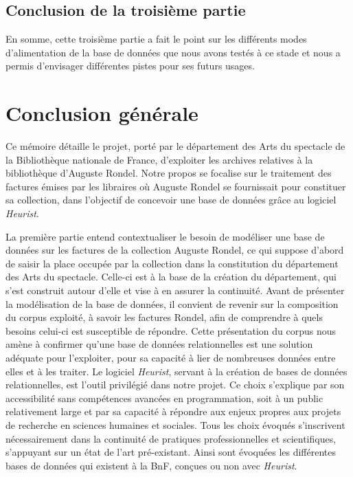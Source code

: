 \documentclass[12pt,twoside]{book}
\begin{document}
\section{Conclusion de la troisième partie}

En somme, cette troisième partie a fait le point sur les différents modes d'alimentation de la base de données que nous avons testés à ce stade et nous a permis d'envisager différentes pistes pour ses futurs usages. 


	\chapter*{Conclusion générale}

Ce mémoire détaille le projet, porté par le département des Arts du spectacle de la Bibliothèque nationale de France, d'exploiter les archives relatives à la bibliothèque d'Auguste Rondel. Notre propos se focalise sur le traitement des factures émises par les libraires où Auguste Rondel se fournissait pour constituer sa collection, dans l'objectif de concevoir une base de données grâce au logiciel \emph{Heurist}. 


La première partie entend contextualiser le besoin de modéliser une base de données sur les factures de la collection Auguste Rondel, ce qui suppose d'abord de saisir la place occupée par la collection dans la constitution du département des Arts du spectacle. Celle-ci est à la base de la création du département, qui s'est construit autour d'elle et vise à en assurer la continuité. Avant de présenter la modélisation de la base de données, il convient de revenir sur la composition du corpus exploité, à savoir les factures Rondel, afin de comprendre à quels besoins celui-ci est susceptible de répondre. Cette présentation du corpus nous amène à confirmer qu'une base de données relationnelles est une solution adéquate pour l'exploiter, pour sa capacité à lier de nombreuses données entre elles et à les traiter. Le logiciel \emph{Heurist}, servant à la création de bases de données relationnelles, est l'outil privilégié dans notre projet. Ce choix s'explique par son accessibilité sans compétences avancées en programmation, soit à un public relativement large et par sa capacité à répondre aux enjeux propres aux projets de recherche en sciences humaines et sociales. Tous les choix évoqués s'inscrivent nécessairement dans la continuité de pratiques professionnelles et scientifiques, s'appuyant sur un état de l'art pré-existant. Ainsi sont évoquées les différentes bases de données qui existent à la BnF, conçues ou non avec \emph{Heurist}. 
\end{document}
